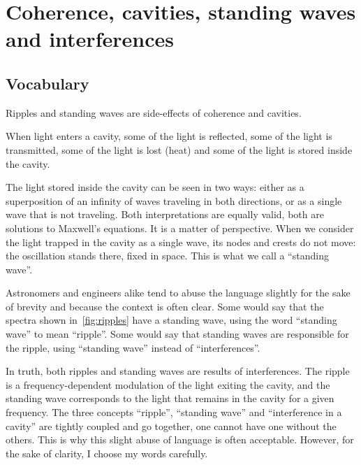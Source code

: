 \FloatBarrier
\section{Coherence, cavities, standing waves and interferences}
\label{sec:coherence}

\subsection{Vocabulary}

Ripples and standing waves are side-effects of coherence and cavities.

When light enters a cavity, some of the light is reflected, some of the light is transmitted, some of the light is lost (heat) and some of the light is stored inside the cavity.

The light stored inside the cavity can be seen in two ways:
either as a superposition of an infinity of waves traveling in both directions,
or as a single wave that is not traveling.
Both interpretations are equally valid, both are solutions to Maxwell's equations.
It is a matter of perspective.
When we consider the light trapped in the cavity as a single wave, its nodes and crests do not move: the oscillation stands there, fixed in space.
This is what we call a ``standing wave''.

Astronomers and engineers alike tend to abuse the language slightly for the sake of brevity and because the context is often clear.
Some would say that the spectra shown in~\cref{fig:ripples} have a standing wave, using the word ``standing wave'' to mean ``ripple''.
Some would say that standing waves are responsible for the ripple, using ``standing wave'' instead of ``interferences''.

In truth, both ripples and standing waves are results of interferences.
The ripple is a frequency-dependent modulation of the light exiting the cavity, and the standing wave corresponds to the light that remains in the cavity for a given frequency.
The three concepts ``ripple'', ``standing wave'' and ``interference in a cavity'' are tightly coupled and go together, one cannot have one without the others.
This is why this slight abuse of language is often acceptable.
However, for the sake of clarity, I choose my words carefully.



